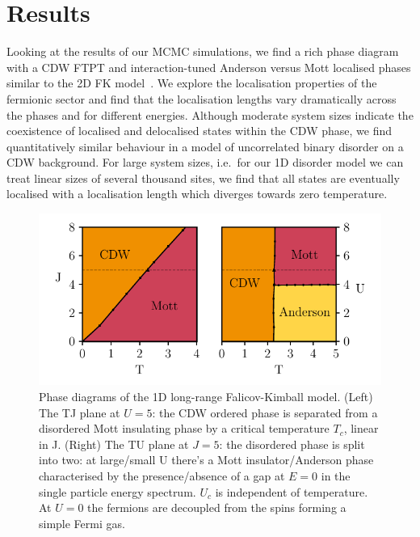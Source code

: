 \hypertarget{sec:lrfk-results}{%
\section{Results}\label{sec:lrfk-results}}

Looking at the results of our MCMC simulations, we find a rich phase diagram with a CDW FTPT and interaction-tuned Anderson versus Mott localised phases similar to the 2D FK model~\autocite{antipovInteractionTunedAndersonMott2016}. We explore the localisation properties of the fermionic sector and find that the localisation lengths vary dramatically across the phases and for different energies. Although moderate system sizes indicate the coexistence of localised and delocalised states within the CDW phase, we find quantitatively similar behaviour in a model of uncorrelated binary disorder on a CDW background. For large system sizes, i.e.~for our 1D disorder model we can treat linear sizes of several thousand sites, we find that all states are eventually localised with a localisation length which diverges towards zero temperature.

\hypertarget{fig:phase-diagram-lrfk}{%
\begin{figure}
\centering
\includegraphics[width=1\textwidth,height=\textheight]{figure_code/fk_chapter/phase_diagram/phase_diagram}
\caption[{Long-Range Falicov Kimball Model Phase Diagram}]{Phase diagrams of the 1D long-range Falicov-Kimball model. (Left) The TJ plane at \(U = 5\): the CDW ordered phase is separated from a disordered Mott insulating phase by a critical temperature \(T_c\), linear in J. (Right) The TU plane at \(J = 5\): the disordered phase is split into two: at large/small U there's a Mott insulator/Anderson phase characterised by the presence/absence of a gap at \(E=0\) in the single particle energy spectrum. \(U_c\) is independent of temperature. At \(U = 0\) the fermions are decoupled from the spins forming a simple Fermi gas.}
\label{fig:phase-diagram-lrfk}
\end{figure}
}


